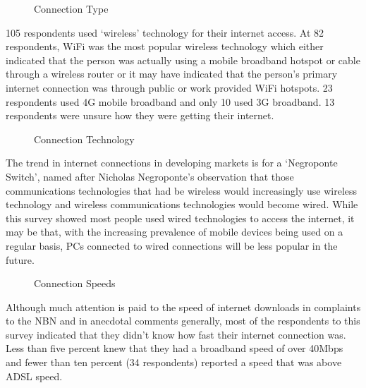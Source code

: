\begin{figure}
\centering
{}
\caption{Connection Type}
\label{fig:ConnectionType}
\end{figure}

105 respondents used `wireless' technology for their internet access. At 82 respondents, WiFi was the most popular wireless technology which either indicated that the person was actually using a mobile broadband hotspot or cable through a wireless router or it may have indicated that the person's primary internet connection was through public or work provided WiFi hotspots. 23 respondents used 4G mobile broadband and only 10 used 3G broadband. 13 respondents were unsure how they were getting their internet.

\begin{figure}
\centering
{}\label{fig:ConnectionTech}
\caption{Connection Technology}
\end{figure}

The trend in internet connections in developing markets is for a `Negroponte Switch', named after Nicholas Negroponte's observation that those communications technologies that had be wireless would increasingly use wireless technology and wireless communications technologies would become wired.\cite{RefWorks:361} While this survey showed most people used wired technologies to access the internet, it may be that, with the increasing prevalence of mobile devices being used on a regular basis, PCs connected to wired connections will be less popular in the future.



\begin{figure}
\centering
{}
\caption{Connection Speeds}
\label{fig:ConnectionSpeed}
\end{figure}

Although much attention is paid to the speed of internet downloads in complaints to the NBN and in anecdotal comments generally, most of the respondents to this survey indicated that they didn't know how fast their internet connection was. Less than five percent knew that they had a broadband speed of over 40Mbps and fewer than ten percent (34 respondents) reported a speed that was above ADSL speed. 


